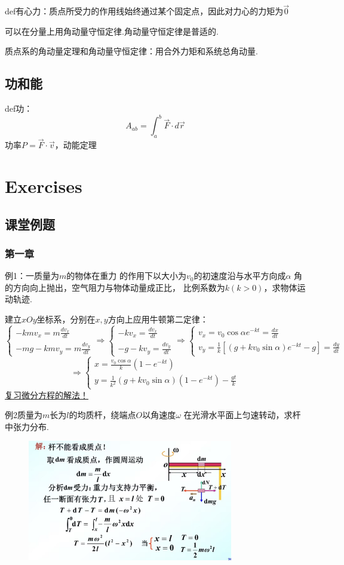 \documentclass[10pt,a4paper]{article}
\begin{document}
def有心力：质点所受力的作用线始终通过某个固定点，因此对力心的力矩为$\vec{0}$

可以在分量上用角动量守恒定律.角动量守恒定律是普适的.

质点系的角动量定理和角动量守恒定律：用合外力矩和系统总角动量.
\subsection{功和能}
def功：
\[A_{ab}=\int_a^b \vec{F}\cdot d\vec{r}\]
功率$P=\vec{F}\cdot \vec{v}$，动能定理
\section{Exercises}
\subsection{课堂例题}
\subsubsection{第一章}
例1：一质量为$m$的物体在重力 的作用下以大小为$v_0$的初速度沿与水平方向成$\alpha$
角的方向向上抛出，空气阻力与物体动量成正比，
比例系数为$k(k>0)$，求物体运动轨迹.

建立$xOy$坐标系，分别在$x,y$方向上应用牛顿第二定律：
\[
\begin{cases}
-kmv_x=m\frac{dv_x}{dt}\\
-mg-kmv_y=m\frac{dv_y}{dt}
\end{cases}\Rightarrow
\begin{cases}
-kv_x=\frac{dv_x}{dt}\\
-g-kv_y=\frac{dv_y}{dt}
\end{cases}\Rightarrow
\begin{cases}
v_x=v_0\cos\alpha e^{-kt}=\frac{dx}{dt}\\
v_y=\frac{1}{k}[(g+kv_0\sin\alpha)e^{-kt}-g]=\frac{dy}{dt}
\end{cases}\]
\[
\Rightarrow
\begin{cases}
x=\frac{v_0\cos\alpha}{k}(1-e^{-kt})\\
y=\frac{1}{k^2}(g+kv_0\sin\alpha)(1-e^{-kt})-\frac{gt}{k}
\end{cases}
\]\underline{复习微分方程的解法！}

例2质量为$m$长为$l$的均质杆，绕端点$O$以角速度$\omega$
在光滑水平面上匀速转动，求杆中张力分布.
\begin{figure}[h]
\centering
\includegraphics[width=0.8\textwidth]{eg2.jpg}
\end{figure}
\end{document}
